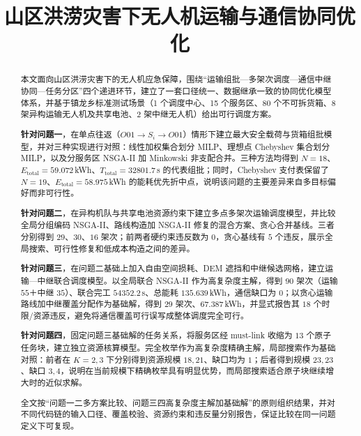 \documentclass[bwprint]{gmcmthesis}
\title{山区洪涝灾害下无人机运输与通信协同优化}
\begin{document}
\maketitle

\begin{abstract}

本文面向山区洪涝灾害下的无人机应急保障，围绕“运输组批—多架次调度—通信中继协同—任务分区”四个递进环节，建立了一套口径统一、数据继承一致的协同优化模型体系，并基于镇龙乡标准测试场景（1 个调度中心、15 个服务区、80 个不可拆货箱、8 架异构运输无人机及共享电池、2 架中继无人机）给出可行调度方案。

\textbf{针对问题一}，在单点往返（$O01\to S_i\to O01$）情形下建立最大安全载荷与货箱组批模型，并对三种实现进行对照：线性加权集合划分 MILP、理想点 Chebyshev 集合划分 MILP，以及分服务区 NSGA-II 加 Minkowski 非支配合并。三种方法均得到 $N=18$、$E_{\text{total}}=59.072\,$kWh、$T_{\text{total}}=32801.7\,$s 的代表组批；同时，Chebyshev 支付表保留了 $N=19$、$E_{\text{total}}=58.975\,$kWh 的能耗优先折中点，说明该问题的主要差异来自多目标偏好而非可行性。

\textbf{针对问题二}，在异构机队与共享电池资源约束下建立多点多架次运输调度模型，并比较全局分组编码 NSGA-II、路线构造加 NSGA-II 修复的混合方案、贪心合并基线。三者分别得到 $29$、$30$、$16$ 架次；前两者硬约束违反数为 $0$，贪心基线有 $5$ 个违反，展示全局搜索、可行性修复和低成本构造之间的差异。

\textbf{针对问题三}，在问题二基础上加入自由空间损耗、DEM 遮挡和中继候选网格，建立运输—中继联合调度模型。以全局联合 NSGA-II 作为高复杂度主解，得到 $90$ 架次（运输 $55$＋中继 $35$）、联合完工 $54352.2\,$s、总能耗 $135.639\,$kWh，通信缺口为 $0$；以贪心运输路线加中继覆盖分配作为基础解，得到 $29$ 架次、$67.387\,$kWh，并显式报告其 $18$ 个时限/资源违反，避免将通信覆盖可行误写成整体调度完全可行。

\textbf{针对问题四}，固定问题三基础解的任务关系，将服务区经 must-link 收缩为 $13$ 个原子任务块，建立独立资源核算模型。完全枚举作为高复杂度精确主解，局部搜索作为基础对照：前者在 $K=2,3$ 下分别得到资源规模 $18,21$、缺口均为 $1$；后者得到规模 $23,23$、缺口 $3,4$，说明在当前规模下精确枚举具有明显优势，而局部搜索适合原子块继续增大时的近似求解。

全文按“问题一二多方案比较、问题三四高复杂度主解加基础解”的原则组织结果，并对不同代码链的输入口径、覆盖校验、资源约束和违反量分别报告，保证比较在同一问题定义下可复现。

\end{abstract}
\end{document}

